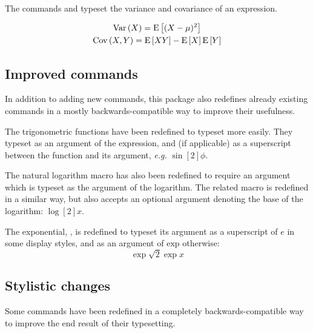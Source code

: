 \documentclass[commonsets,load]{skdoc}
\begin{document}
  \DescribeMacro{}
  \DescribeMacro{}
  The commands \Macro\var and \Macro\cov typeset the variance and
  covariance of an expression.
\begin{example}
\begin{gather*}
  \operatorname{Var}\left(X\right) = \operatorname{E}\left[(X-\mu)^2\right]\\
  \operatorname{Cov}\left(X,Y\right) = \operatorname{E}\left[XY\right]-\operatorname{E}\left[X\right]\operatorname{E}\left[Y\right]
\end{gather*}
\end{example}
 
  \subsection{Improved commands}
  In addition to adding new commands, this package also redefines
  already existing commands in a mostly backwards-compatible way
  to improve their usefulness.
 
  \DescribeMacro{} 
  \DescribeMacro{} 
  \DescribeMacro{} 
  \DescribeMacro{} 
  \DescribeMacro{} 
  \DescribeMacro{} 
  \DescribeMacro{} 
  The trigonometric functions have been redefined
  to typeset more easily. They typeset  as an
  argument of the expression, and (if applicable)  as
  a superscript between the function and its argument,
  \emph{e.g.} \(\sin[2]{\phi}\).
 
  \DescribeMacro{}
  The natural logarithm macro \Macro\ln has also been redefined to 
  require an argument which is typeset as the argument of the logarithm.
  \DescribeMacro{}
  The related macro \Macro\log is redefined in a similar way, but also 
  accepts an optional argument denoting the base of the logarithm:
  \(\log[2]{x}\).
 
  \DescribeMacro{}
  The exponential, \Macro\exp, is redefined to typeset its argument as a
  superscript of \(e\) in some display styles, and as an argument of
  \(\mathrm{exp}\) otherwise:
  \begin{equation*}
    \exp{\sqrt{2}\exp{x}}
  \end{equation*}

  \subsection{Stylistic changes}
  Some commands have been redefined in a completely backwards-compatible
  way to improve the end result of their typesetting.
 
\end{document}
